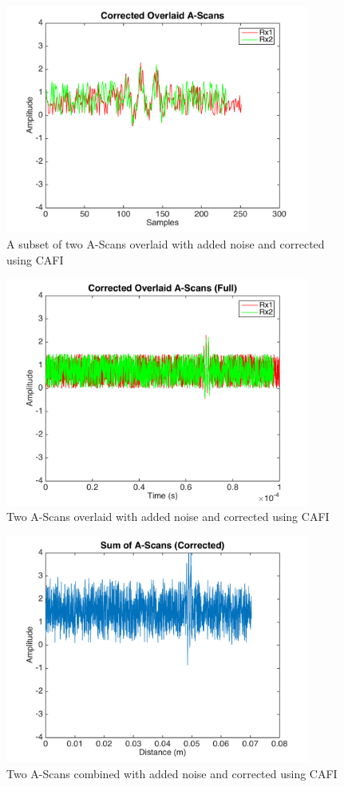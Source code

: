 \begin{figure}[htb]
\centering
		\includegraphics[width=100mm]{Noise_6.png}
		\caption{A subset of two A-Scans overlaid with added noise and corrected using CAFI}
		\label{fig:cafi_noise6}
\end{figure}
\begin{figure}[htb]
\centering
		\includegraphics[width=100mm]{Noise_7.png}
		\caption{Two A-Scans overlaid with added noise and corrected using CAFI}
		\label{fig:cafi_noise7}
\end{figure}
\begin{figure}[htb]
\centering
		\includegraphics[width=100mm]{Noise_8.png}
		\caption{Two A-Scans combined with added noise and corrected using CAFI}
		\label{fig:cafi_noise8}
\end{figure}

